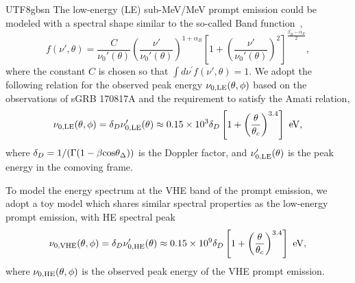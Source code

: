 \documentclass[fleqn,usenatbib]{mnras}
\begin{document}
\begin{CJK*}{UTF8}{gbsn}
The low-energy (LE) sub-MeV/MeV prompt emission could be modeled with a spectral shape similar to the so-called Band function~\citep[e.g.,,][]{Ioka:2019jlj},
\begin{equation}
    f(\nu', \theta) = \frac{C}{\nu_0'(\theta)} \left(\frac{\nu'}{\nu_0'(\theta)}\right)^{1 + \alpha_B}\left[1 + \left(\frac{\nu'}{\nu_0'(\theta)}\right)^{2}\right]^{\frac{\beta_B - \alpha_B}{2}},
\label{eq:band}
\end{equation}
where the constant $C$ is chosen so that $\int d\nu^\prime f(\nu', \theta) = 1$.
We adopt the following relation for the observed peak energy $\nu_{0,\rm LE}(\theta, \phi)$ based on the observations of sGRB 170817A and the requirement to satisfy the Amati relation,  
\begin{equation}\label{eq:energy_comoving}
    \nu_{0,\rm LE}(\theta, \phi) = \delta_D \nu_{0,\rm LE}'(\theta) \approx 0.15 \times 10^3 \delta_D \left[1+\left(\frac{\theta}{\theta_c}\right)^{3.4}\right] {\rm~eV},
\end{equation}
where $\delta_D = 1 / (\Gamma (1 - \beta {\rm cos}\theta_\Delta))$ is the Doppler factor, and  $\nu_{0,\rm LE}'(\theta)$ is the peak energy in the comoving frame.

To model the energy spectrum at the VHE band of the prompt emission, we adopt a toy model which shares similar spectral properties as the low-energy prompt emission, with HE spectral peak
\begin{equation}\label{eq:energy_comoving}
     \nu_{0,\rm VHE}(\theta, \phi) = \delta_D \nu_{0,\rm HE}'(\theta) \approx 0.15 \times 10^9 \delta_D \left[1+\left(\frac{\theta}{\theta_c}\right)^{3.4}\right] {\rm~eV},
\end{equation}
where $\nu_{0,\rm HE}(\theta, \phi)$ is the observed peak energy of the VHE prompt emission. 


\end{CJK*}
\end{document}

